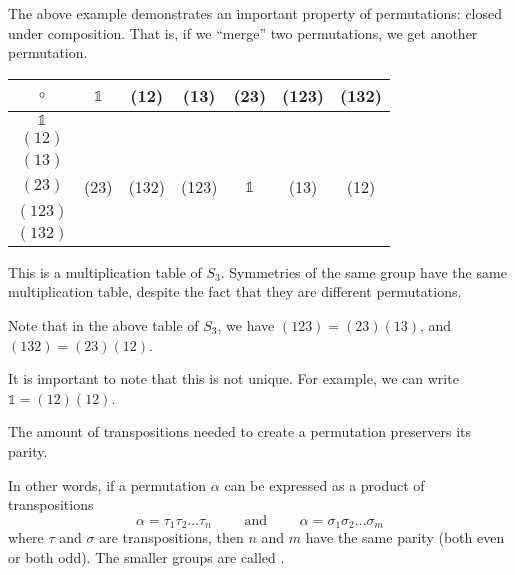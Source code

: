 The above example demonstrates an important property of permutations: closed under composition. That is, if we ``merge'' two permutations, we get another permutation.

\newpage
\begin{table}[ht!]
    \centering
    \renewcommand{\arraystretch}{1.25}
    \begin{tabular}{c|c|c|c|c|c|c}
        $\circ$ & $\mathds{1}$ & (12) & (13) & (23) & (123) & (132) \\
        \hline
        $\mathds{1}$ & & & & & \\
        \hline
        $(12)$ & & & & & \\
        \hline
        $(13)$ & & & & & \\
        \hline
        $(23)$ & (23) & (132) & (123) & $\mathds{1}$ & (13) & (12)\\
        \hline
        $(123)$ & & & & & \\
        \hline
        $(132)$ & & & & &
    \end{tabular}
\end{table}

This is a multiplication table of $S_3$. Symmetries of the same group have the same multiplication table, despite the fact that they are different permutations.

\begin{remark}
    Note that in the above table of $S_3$, we have $(1 2 3) = (2 3)(1 3)$, and $(1 3 2) = (2 3)(1 2)$.  

    It is important to note that this is not unique. For example, we can write $\mathds{1} = (12)(12)$. 
\end{remark}

\begin{theorem}
    The amount of transpositions needed to create a permutation preservers its parity.
\end{theorem}

In other words, if a permutation $\alpha$ can be expressed as a product of transpositions \[
    \alpha = \tau_1 \tau_2 \dots \tau_n \qquad \text{ and } \qquad \alpha = \sigma_1 \sigma_2 \dots \sigma_m
\] where $\tau$ and $\sigma$ are transpositions, then $n$ and $m$ have the same parity (both even or both odd). The smaller groups are called .

